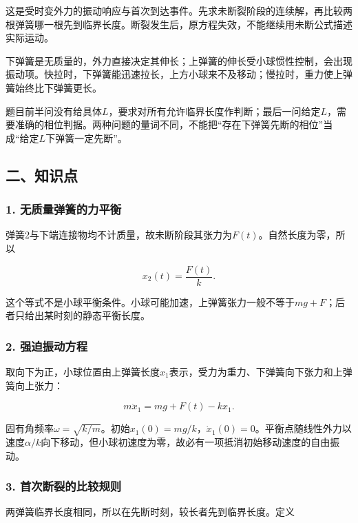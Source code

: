 \documentclass[12pt,a4paper,fontset=fandol]{ctexart}
\begin{document}
这是受时变外力的振动响应与首次到达事件。先求未断裂阶段的连续解，再比较两根弹簧哪一根先到临界长度。断裂发生后，原方程失效，不能继续用未断公式描述实际运动。

下弹簧是无质量的，外力直接决定其伸长；上弹簧的伸长受小球惯性控制，会出现振动项。快拉时，下弹簧能迅速拉长，上方小球来不及移动；慢拉时，重力使上弹簧始终比下弹簧更长。

题目前半问没有给具体\(L\)，要求对所有允许临界长度作判断；最后一问给定\(L\)，需要准确的相位判据。两种问题的量词不同，不能把``存在下弹簧先断的相位''当成``给定\(L\)下弹簧一定先断''。

\subsection{二、知识点}\label{ux4e8cux77e5ux8bc6ux70b9-4}

\subsubsection{1.
无质量弹簧的力平衡}\label{ux65e0ux8d28ux91cfux5f39ux7c27ux7684ux529bux5e73ux8861}

弹簧2与下端连接物均不计质量，故未断阶段其张力为\(F(t)\)。自然长度为零，所以

\[
x_2(t)=\frac{F(t)}k.
\]

这个等式不是小球平衡条件。小球可能加速，上弹簧张力一般不等于\(mg+F\)；后者只给出某时刻的静态平衡长度。

\subsubsection{2.
强迫振动方程}\label{ux5f3aux8febux632fux52a8ux65b9ux7a0b}

取向下为正，小球位置由上弹簧长度\(x_1\)表示，受力为重力、下弹簧向下张力和上弹簧向上张力：

\[
m\ddot x_1=mg+F(t)-kx_1.
\]

固有角频率\(\omega=\sqrt{k/m}\)。初始\(x_1(0)=mg/k\)，\(\dot x_1(0)=0\)。平衡点随线性外力以速度\(\alpha/k\)向下移动，但小球初速度为零，故必有一项抵消初始移动速度的自由振动。

\subsubsection{3.
首次断裂的比较规则}\label{ux9996ux6b21ux65adux88c2ux7684ux6bd4ux8f83ux89c4ux5219}

两弹簧临界长度相同，所以在先断时刻，较长者先到临界长度。定义
\end{document}
